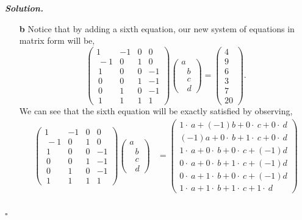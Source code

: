 \documentclass[12pt]{report}
\newenvironment{solution}[1][\it{Solution}]{\textbf{#1. } }{$\square$}
\begin{document}
\begin{solution}
\begin{enumerate}
        \item [{\bf b}]
        Notice that by adding a sixth equation, our new system of equations in matrix form will be, 
        \[ 
            \begin{pmatrix}1&-1&0&0\\ \:-1&0&1&0\\ \:1&0&0&-1\\ \:0&0&1&-1\\ \:0&1&0&-1\\ \:1&1&1&1\end{pmatrix}\begin{pmatrix}a\\ \:\:\:b\\ \:\:\:c\\ \:\:\:d\end{pmatrix} = \begin{pmatrix}
                4\\9\\6\\3\\7\\20
            \end{pmatrix}.
        \]
        We can see that the sixth equation will be exactly satisfied by observing,
        \begin{align*}
            \begin{pmatrix}1&-1&0&0\\ \:-1&0&1&0\\ \:1&0&0&-1\\ \:0&0&1&-1\\ \:0&1&0&-1\\ \:1&1&1&1\end{pmatrix}\begin{pmatrix}a\\ \:\:\:b\\ \:\:\:c\\ \:\:\:d\end{pmatrix} &= \begin{pmatrix}1\cdot \:a+\left(-1\right)b+0\cdot \:c+0\cdot \:d\\ \left(-1\right)a+0\cdot \:b+1\cdot \:c+0\cdot \:d\\ 1\cdot \:a+0\cdot \:b+0\cdot \:c+\left(-1\right)d\\ 0\cdot \:a+0\cdot \:b+1\cdot \:c+\left(-1\right)d\\ 0\cdot \:a+1\cdot \:b+0\cdot \:c+\left(-1\right)d\\ 1\cdot \:a+1\cdot \:b+1\cdot \:c+1\cdot \:d\end{pmatrix}\\

\end{align*}
\end{enumerate}
\end{solution}
\end{document}
